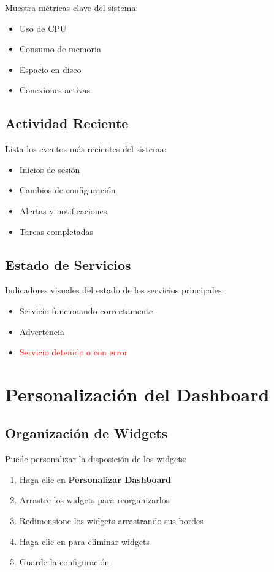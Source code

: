 Muestra métricas clave del sistema:
\begin{itemize}
    \item Uso de CPU
    \item Consumo de memoria
    \item Espacio en disco
    \item Conexiones activas
\end{itemize}

\subsection{Actividad Reciente}

Lista los eventos más recientes del sistema:
\begin{itemize}
    \item Inicios de sesión
    \item Cambios de configuración
    \item Alertas y notificaciones
    \item Tareas completadas
\end{itemize}

\subsection{Estado de Servicios}

Indicadores visuales del estado de los servicios principales:
\begin{itemize}
    \item {} \textcolor{sandraGreen}{Servicio funcionando correctamente}
    \item {} \textcolor{sandraAccent}{Advertencia}
    \item {} \textcolor{red}{Servicio detenido o con error}
\end{itemize}

\section{Personalización del Dashboard}

\subsection{Organización de Widgets}

Puede personalizar la disposición de los widgets:

\begin{enumerate}
    \item Haga clic en \textbf{Personalizar Dashboard}
    \item Arrastre los widgets para reorganizarlos
    \item Redimensione los widgets arrastrando sus bordes
    \item Haga clic en  para eliminar widgets
    \item Guarde la configuración
\end{enumerate}

